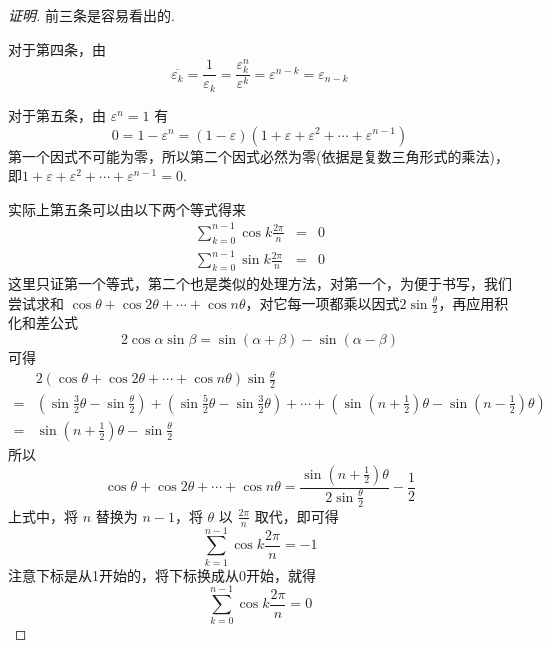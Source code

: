 \begin{proof}[证明]
  前三条是容易看出的.

  对于第四条，由
  \[ \overline{\varepsilon_k} = \frac{1}{\varepsilon_k} = \frac{\varepsilon_k^n}{\varepsilon^k} = \varepsilon^{n-k} = \varepsilon_{n-k} \]

  对于第五条，由 $\varepsilon^n=1$ 有
  \[ 0 = 1- \varepsilon^n = (1-\varepsilon)(1+\varepsilon+\varepsilon^2+\cdots+\varepsilon^{n-1}) \]
  第一个因式不可能为零，所以第二个因式必然为零(依据是复数三角形式的乘法)，即$1+\varepsilon+\varepsilon^2+\cdots+\varepsilon^{n-1}=0$.

  实际上第五条可以由以下两个等式得来
  \begin{eqnarray*}
    \sum_{k=0}^{n-1} \cos k \frac{2\pi}{n} & = & 0 \\
    \sum_{k=0}^{n-1} \sin k \frac{2\pi}{n} & = & 0
  \end{eqnarray*}
  这里只证第一个等式，第二个也是类似的处理方法，对第一个，为便于书写，我们尝试求和 $\cos\theta + \cos 2\theta + \cdots + \cos n \theta$，对它每一项都乘以因式$2\sin \frac{\theta}{2}$，再应用积化和差公式
  \[ 2\cos\alpha\sin\beta = \sin(\alpha+\beta) - \sin(\alpha-\beta) \]
  可得
  \begin{equation*}
    \begin{split}
      & 2(\cos\theta + \cos 2\theta + \cdots + \cos n \theta)\sin \frac{\theta}{2} \\
      = & \left(\sin \frac{3}{2} \theta - \sin  \frac{\theta}{2} \right) + \left(\sin \frac{5}{2}\theta - \sin \frac{3}{2}\theta \right) + \cdots + \left(\sin \left(n+\frac{1}{2}\right)\theta - \sin \left(n-\frac{1}{2}\right)\theta \right) \\
      = & \sin \left(n+\frac{1}{2}\right)\theta - \sin  \frac{\theta}{2}
    \end{split}
  \end{equation*}
  所以
  \[ \cos\theta + \cos 2\theta + \cdots + \cos n \theta = \frac{\sin \left(n+\frac{1}{2}\right)\theta}{2\sin \frac{\theta}{2}} - \frac{1}{2} \]
  上式中，将 $n$ 替换为 $n-1$，将 $\theta$ 以 $\frac{2\pi}{n}$ 取代，即可得
  \[ \sum_{k=1}^{n-1} \cos k \frac{2\pi}{n} = -1 \]
  注意下标是从1开始的，将下标换成从0开始，就得
  \[ \sum_{k=0}^{n-1} \cos k \frac{2\pi}{n} = 0 \]
\end{proof}



